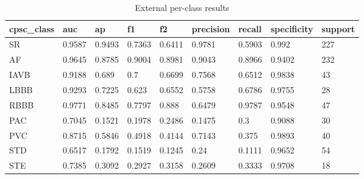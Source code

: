 \begin{table}[htbp]\centering\small
\caption{External per-class results}\label{tab:extperclass}
\begin{tabular}{lllllllll}
\hline
cpsc_class & auc & ap & f1 & f2 & precision & recall & specificity & support \\
\hline
SR & 0.9587 & 0.9493 & 0.7363 & 0.6411 & 0.9781 & 0.5903 & 0.992 & 227 \\
AF & 0.9645 & 0.8785 & 0.9004 & 0.8981 & 0.9043 & 0.8966 & 0.9402 & 232 \\
IAVB & 0.9188 & 0.689 & 0.7 & 0.6699 & 0.7568 & 0.6512 & 0.9838 & 43 \\
LBBB & 0.9293 & 0.7225 & 0.623 & 0.6552 & 0.5758 & 0.6786 & 0.9755 & 28 \\
RBBB & 0.9771 & 0.8485 & 0.7797 & 0.888 & 0.6479 & 0.9787 & 0.9548 & 47 \\
PAC & 0.7045 & 0.1521 & 0.1978 & 0.2486 & 0.1475 & 0.3 & 0.9088 & 30 \\
PVC & 0.8715 & 0.5846 & 0.4918 & 0.4144 & 0.7143 & 0.375 & 0.9893 & 40 \\
STD & 0.6517 & 0.1792 & 0.1519 & 0.1245 & 0.24 & 0.1111 & 0.9652 & 54 \\
STE & 0.7385 & 0.3092 & 0.2927 & 0.3158 & 0.2609 & 0.3333 & 0.9708 & 18 \\
\hline
\end{tabular}
\end{table}
